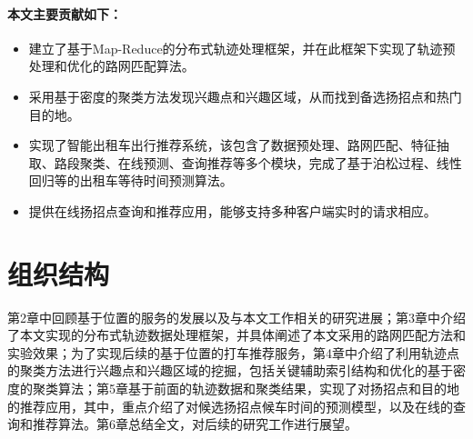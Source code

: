 \paragraph{本文主要贡献如下：}

\begin{itemize}
	\item 建立了基于Map-Reduce的分布式轨迹处理框架，并在此框架下实现了轨迹预处理和优化的路网匹配算法。
	\item 采用基于密度的聚类方法发现兴趣点和兴趣区域，从而找到备选扬招点和热门目的地。
	\item 实现了智能出租车出行推荐系统，该包含了数据预处理、路网匹配、特征抽取、路段聚类、在线预测、查询推荐等多个模块，完成了基于泊松过程、线性回归等的出租车等待时间预测算法。
	\item 提供在线扬招点查询和推荐应用，能够支持多种客户端实时的请求相应。
\end{itemize}

\section{组织结构}

第2章中回顾基于位置的服务的发展以及与本文工作相关的研究进展；第3章中介绍了本文实现的分布式轨迹数据处理框架，并具体阐述了本文采用的路网匹配方法和实验效果；为了实现后续的基于位置的打车推荐服务，第4章中介绍了利用轨迹点的聚类方法进行兴趣点和兴趣区域的挖掘，包括关键辅助索引结构和优化的基于密度的聚类算法；第5章基于前面的轨迹数据和聚类结果，实现了对扬招点和目的地的推荐应用，其中，重点介绍了对候选扬招点候车时间的预测模型，以及在线的查询和推荐算法。第6章总结全文，对后续的研究工作进行展望。

